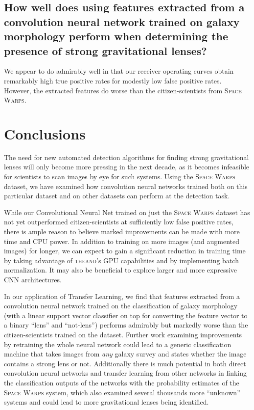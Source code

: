 \documentclass[10pt,twocolumn,letterpaper]{article}
\begin{document}
\subsection*{How well does using features extracted from a convolution neural
network trained on galaxy morphology perform when determining the presence of
strong gravitational lenses?}

We appear to do admirably well in that our receiver operating curves obtain
remarkably high true positive rates for modestly low false positive rates.
However, the extracted features do worse than the citizen-scientists from
\textsc{Space Warps}.

\section{Conclusions}

The need for new automated detection algorithms for finding strong
gravitational lenses will only become more pressing in the next decade, as it
becomes infeasible for scientists to scan images by eye for such systems. Using
the \textsc{Space Warps} dataset, we have examined how convolution neural
networks trained both on this particular dataset and on other datasets can
perform at the detection task.

While our Convolutional Neural Net trained on just the \textsc{Space Warps} dataset 
has not yet outperformed citizen-scientists at sufficiently low false positive rates, there is 
ample reason to believe marked improvements can be made with more time and 
CPU power. In addition to training on more images (and augmented images) for longer, 
we can expect to gain a significant reduction in training time by taking advantage of 
\textsc{theano}'s GPU capabilities and by implementing batch normalization. \cite{Ioffe:2015aa} 
It may also be beneficial to explore larger and more expressive CNN architectures.

In our application of Transfer Learning, we find that features extracted from a convolution neural network trained on
the classification of galaxy morphology (with a linear support vector
classifier on top for converting the feature vector to a binary ``lens'' and
``not-lens'') performs admirably but markedly worse than the citizen-scientists
trained on the dataset. Further work examining improvements by retraining the
whole neural network could lead to a generic classification machine that takes
images from \textit{any} galaxy survey and states whether the image contains a
strong lens or not. Additionally there is much potential in both direct
convolution neural networks and transfer learning from other networks in
linking the classification outputs of the networks with the probability
estimates of the \textsc{Space Warps} system, which also examined several
thousands more ``unknown'' systems and could lead to more gravitational lenses
being identified.
\end{document}
